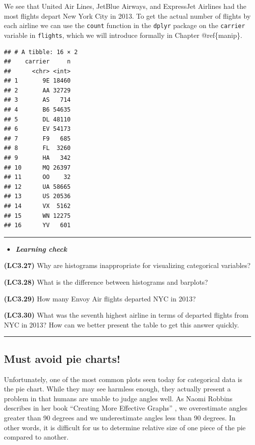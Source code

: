 \documentclass[]{tufte-book}
\let\oldrule=\rule
\renewcommand{\rule}[1]{\oldrule{\linewidth}}
\newenvironment{rmdblock}[1]
  {\begin{shaded*}
  \begin{itemize}
  \renewcommand{\labelitemi}{
    \raisebox{-.7\height}[0pt][0pt]{
    }
  }
  \item
  }
  {
  \end{itemize}
  \end{shaded*}
  }
\newenvironment{learncheck}
  {\begin{rmdblock}{warning}}
  {\end{rmdblock}}
\begin{document}
We see that United Air Lines, JetBlue Airways, and ExpressJet Airlines
had the most flights depart New York City in 2013. To get the actual
number of flights by each airline we can use the \texttt{count} function
in the \texttt{dplyr} package on the \texttt{carrier} variable in
\texttt{flights}, which we will introduce formally in Chapter
@ref\{manip\}.

\begin{verbatim}
## # A tibble: 16 × 2
##    carrier     n
##      <chr> <int>
## 1       9E 18460
## 2       AA 32729
## 3       AS   714
## 4       B6 54635
## 5       DL 48110
## 6       EV 54173
## 7       F9   685
## 8       FL  3260
## 9       HA   342
## 10      MQ 26397
## 11      OO    32
## 12      UA 58665
## 13      US 20536
## 14      VX  5162
## 15      WN 12275
## 16      YV   601
\end{verbatim}

\begin{center}\rule{0.5\linewidth}{\linethickness}\end{center}

\begin{learncheck}
\textbf{\emph{Learning check}}
\end{learncheck}

\textbf{(LC3.27)} Why are histograms inappropriate for visualizing
categorical variables?

\textbf{(LC3.28)} What is the difference between histograms and
barplots?

\textbf{(LC3.29)} How many Envoy Air flights departed NYC in 2013?

\textbf{(LC3.30)} What was the seventh highest airline in terms of
departed flights from NYC in 2013? How can we better present the table
to get this answer quickly.

\begin{center}\rule{0.5\linewidth}{\linethickness}\end{center}

\subsection{Must avoid pie charts!}\label{must-avoid-pie-charts}

Unfortunately, one of the most common plots seen today for categorical
data is the pie chart. While they may see harmless enough, they actually
present a problem in that humans are unable to judge angles well. As
Naomi Robbins describes in her book ``Creating More Effective Graphs''
\citep{robbins2013}, we overestimate angles greater than 90 degrees and
we underestimate angles less than 90 degrees. In other words, it is
difficult for us to determine relative size of one piece of the pie
compared to another.
\end{document}
